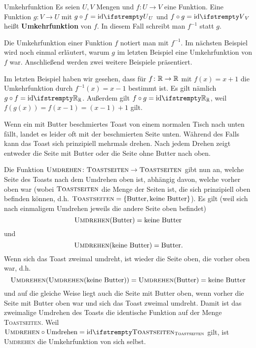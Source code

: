 \documentclass[../../main.tex]{subfiles}
\begin{document}
\begin{definition}{Umkehrfunktion}
    Es seien $U,V$ Mengen und $f\colon U\rightarrow V$ eine Funktion. Eine Funktion $g\colon V\rightarrow U$ mit $g\circ f=\ident[U]$ und $f\circ g=\ident[V]$ heißt \textbf{Umkehrfunktion} von $f$. In diesem Fall schreibt man $f^{-1}$ statt $g$.
\end{definition}

Die Umkehrfunktion einer Funktion $f$ notiert man mit $f^{-1}$. Im nächsten Beispiel wird noch einmal erläutert, warum $g$ im letzten Beispiel eine Umkehrfunktion von $f$ war. Anschließend werden zwei weitere Beispiele präsentiert.

\begin{example}{}
    Im letzten Beispiel haben wir gesehen, dass für $f\colon\mathbb{R}\rightarrow\mathbb{R}$ mit $f(x)=x+1$ die Umkehrfunktion durch $f^{-1}(x)=x-1$ bestimmt ist. Es gilt nämlich $g\circ f=\ident[\Real]$. Außerdem gilt $f\circ g=\ident[\Real]$, weil $f(g(x))=f(x-1)=(x-1)+1$ gilt.
\end{example}

\begin{example}{}
    Wenn ein mit Butter beschmiertes Toast von einem normalen Tisch nach unten fällt, landet es leider oft mit der beschmierten Seite unten. Während des Falls kann das Toast sich prinzipiell mehrmals drehen. Nach jedem Drehen zeigt entweder die Seite mit Butter oder die Seite ohne Butter nach oben.
    
    Die Funktion $\textsc{Umdrehen}\colon\textsc{Toastseiten}\rightarrow\textsc{Toastseiten}$ gibt nun an, welche Seite des Toasts nach dem Umdrehen oben ist, abhängig davon, welche vorher oben war (wobei $\textsc{Toastseiten}$ die Menge der Seiten ist, die sich prinzipiell oben befinden können, d.h. $\textsc{Toastseiten}=\{\text{Butter},\text{keine Butter}\}$). Es gilt (weil sich nach einmaligem Umdrehen jeweils die andere Seite oben befindet)
    \[\textsc{Umdrehen}(\text{Butter})=\text{keine Butter}\] und \[\textsc{Umdrehen}(\text{keine Butter})=\text{Butter}.\]
    Wenn sich das Toast zweimal umdreht, ist wieder die Seite oben, die vorher oben war, d.h. \[\textsc{Umdrehen}(\textsc{Umdrehen}(\text{keine Butter}))=\textsc{Umdrehen}(\text{Butter})=\text{keine Butter}\]
    und auf die gleiche Weise liegt auch die Seite mit Butter oben, wenn vorher die Seite mit Butter oben war und sich das Toast zweimal umdreht. Damit ist das zweimalige Umdrehen des Toasts die identische Funktion auf der Menge \textsc{Toastseiten}. Weil $\textsc{Umdrehen}\circ \text{Umdrehen}=\ident[\textsc{Toastseiten}]$ gilt, ist \textsc{Umdrehen} die Umkehrfunktion von sich selbst.
\end{example}
\end{document}
